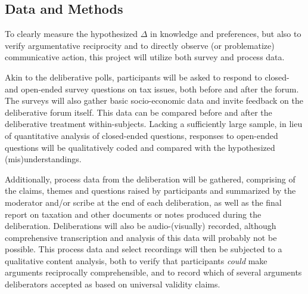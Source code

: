 
\subsection{Data and Methods}
To clearly measure the hypothesized $\Delta$ in knowledge and preferences, but also to verify argumentative reciprocity and to directly observe (or problematize) communicative action, this project will utilize both survey and process data.

Akin to the deliberative polls, participants will be asked to respond to closed- and open-ended survey questions on tax issues, both before and after the forum.
The surveys will also gather basic socio-economic data and invite feedback on the deliberative forum itself.
This data can be compared before and after the deliberative treatment within-subjects.
Lacking a sufficiently large sample, in lieu of quantitative analysis of closed-ended questions, responses to open-ended questions will be qualitatively coded and compared with the hypothesized (mis)understandings.

Additionally, process data from the deliberation will be gathered, comprising of the claims, themes and questions raised by participants and summarized by the moderator and/or scribe at the end of each deliberation, as well as the final report on taxation and other documents or notes produced during the deliberation.
Deliberations will also be audio-(visually) recorded, although comprehensive transcription and analysis of this data will probably not be possible.
This process data and select recordings will then be subjected to a qualitative content analysis, both to verify that participants \emph{could} make arguments reciprocally comprehensible, and to record which of several arguments deliberators accepted as based on universal validity claims.

